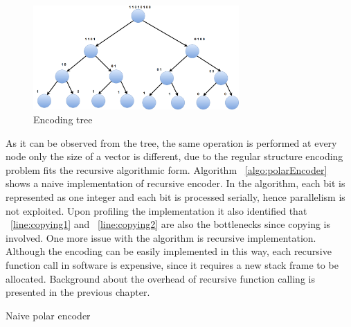 \begin{figure}[]
	\centering
	\includegraphics[width=0.7\textwidth]{./figures/treeEncoding.pdf}
	\caption{Encoding tree}
	\label{fig:treeEncoding}
\end{figure}

As it can be observed from the tree, the same operation is performed at every node only the size of a vector is different, due to the regular structure encoding problem fits the recursive algorithmic form. Algorithm ~\ref{algo:polarEncoder} shows a naive implementation of recursive encoder. In the algorithm, each bit is represented as one integer and each bit is processed serially, hence parallelism is not exploited. Upon profiling the implementation it also identified that ~\ref{line:copying1} and ~\ref{line:copying2} are also the bottlenecks since copying is involved. One more issue with the algorithm is recursive implementation. Although the encoding can be easily implemented in this way, each recursive function call in software is expensive, since it requires a new stack frame to be allocated. Background about the overhead of recursive function calling is presented in the previous chapter.

\IncMargin{1.5em}
\begin{algorithm}[!h]
	\caption{Naive polar encoder}
	\label{algo:polarEncoder}	
\end{algorithm}
\DecMargin{1.5em}

